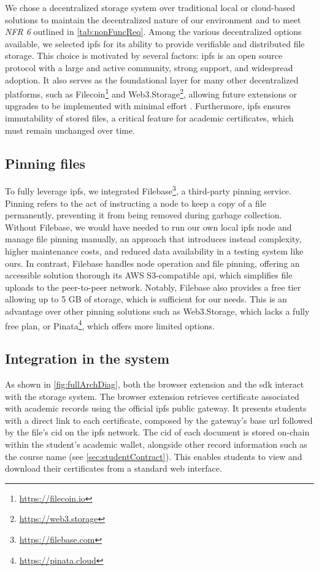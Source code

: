 We chose a decentralized storage system over traditional local or cloud-based solutions to maintain the decentralized nature of our environment and to meet \textit{NFR 6} outlined in \cref{tab:nonFuncReq}. Among the various decentralized options available, we selected \acrfull{ipfs} for its ability to provide verifiable and distributed file storage. This choice is motivated by several factors: \acrshort{ipfs} is an open source protocol with a large and active community, strong support, and widespread adoption. It also serves as the foundational layer for many other decentralized platforms, such as Filecoin\footnote{\url{https://filecoin.io}} and Web3.Storage\footnote{\url{https://web3.storage}}, allowing future extensions or upgrades to be implemented with minimal effort \cite{erikflorian2022ipfsandfrineds}. Furthermore, \acrshort{ipfs} ensures immutability of stored files, a critical feature for academic certificates, which must remain unchanged over time.

\subsection{Pinning files}
To fully leverage \acrshort{ipfs}, we integrated Filebase\footnote{\url{https://filebase.com}}, a third-party pinning service. Pinning refers to the act of instructing a node to keep a copy of a file permanently, preventing it from being removed during garbage collection. Without Filebase, we would have needed to run our own local \acrshort{ipfs} node and manage file pinning manually, an approach that introduces instead complexity, higher maintenance costs, and reduced data availability in a testing system like ours. In contrast, Filebase handles node operation and file pinning, offering an accessible solution thorough its AWS S3-compatible \acrshort{api}, which simplifies file uploads to the peer-to-peer network. Notably, Filebase also provides a free tier allowing up to 5 GB of storage, which is sufficient for our needs. This is an advantage over other pinning solutions such as Web3.Storage, which lacks a fully free plan, or Pinata\footnote{\url{https://pinata.cloud}}, which offers more limited options.

\subsection{Integration in the system}
As shown in \cref{fig:fullArchDiag}, both the browser extension and the \acrshort{sdk} interact with the storage system. The browser extension retrieves certificate associated with academic records using the official \acrshort{ipfs} public gateway. It presents students with a direct link to each certificate, composed by the gateway's base \acrshort{url} followed by the file's \acrfull{cid} on the \acrshort{ipfs} network. The \acrshort{cid} of each document is stored on-chain within the student's academic wallet, alongside other record information such as the course name (see \cref{sec:studentContract}). This enables students to view and download their certificates from a standard web interface.

